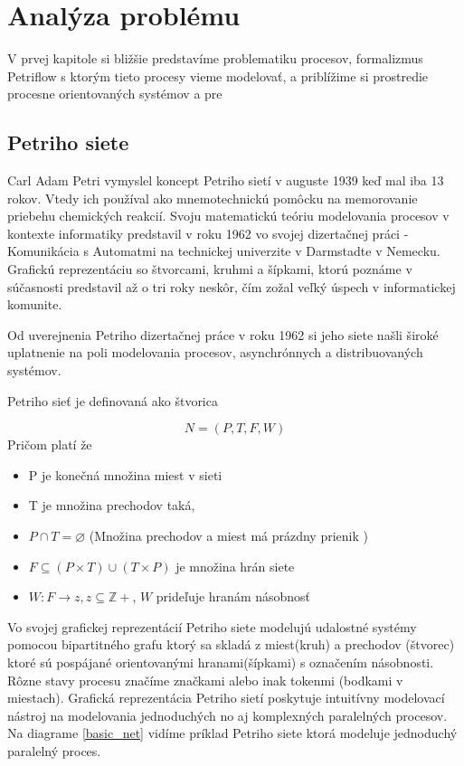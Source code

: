 
\section{Analýza problému}
V prvej kapitole si bližšie predstavíme problematiku procesov, formalizmus Petriflow s ktorým tieto procesy vieme modelovať, a priblížime si prostredie procesne orientovaných systémov a pre

\subsection{Petriho siete}
Carl Adam Petri vymyslel koncept Petriho sietí v auguste 1939 keď mal iba 13 rokov. Vtedy ich používal ako mnemotechnickú pomôcku na memorovanie priebehu chemických reakcií. Svoju matematickú teóriu modelovania procesov v kontexte informatiky predstavil v roku 1962 vo svojej dizertačnej práci - Komunikácia s Automatmi na technickej univerzite v Darmstadte v Nemecku. Grafickú reprezentáciu so štvorcami, kruhmi a šípkami, ktorú poznáme v súčasnosti predstavil až o tri roky neskôr, čím zožal veľký úspech v informatickej komunite. \cite{petri50years} 

Od uverejnenia Petriho dizertačnej práce v roku 1962 si jeho siete našli široké uplatnenie na poli modelovania procesov, asynchrónnych a distribuovaných systémov. 

Petriho sieť je definovaná ako štvorica

\[N = (P, T, F, W )\]
Pričom platí že
\begin{itemize}
\item P je konečná množina miest v sieti
\item T je množina prechodov taká,
\item $P\cap T = \varnothing$ (Množina prechodov a miest má prázdny prienik ) 
\item $F \subseteq (P \times T)\cup(T \times P)$ je množina hrán siete
\item $W: F \rightarrow z, z \subseteq \mathbb Z+$, $W$ prideľuje hranám násobnosť 
\end{itemize}

Vo svojej grafickej reprezentácií Petriho siete modelujú udalostné systémy pomocou bipartitného grafu ktorý sa skladá z miest(kruh) a prechodov (štvorec) ktoré sú pospájané orientovanými hranami(šípkami) s označením násobnosti. Rôzne stavy procesu značíme značkami alebo inak tokenmi (bodkami v miestach).
Grafická reprezentácia Petriho sietí poskytuje intuitívny modelovací nástroj na modelovania jednoduchých no aj komplexných paralelných procesov. Na diagrame \ref{basic_net} vidíme príklad Petriho siete ktorá modeluje jednoduchý paralelný proces. 

